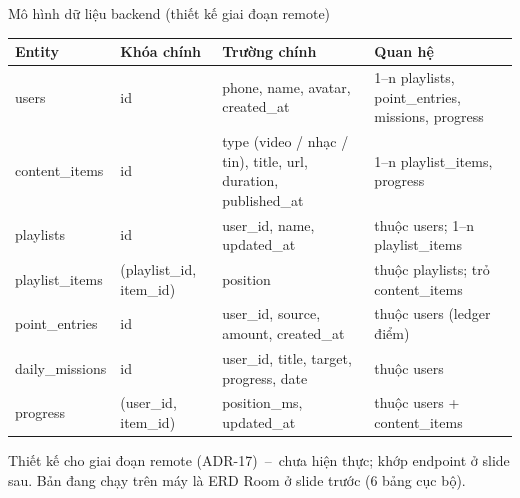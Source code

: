 \begin{frame}{Mô hình dữ liệu backend (thiết kế giai đoạn remote)}
\begin{center}\tiny
\setlength{\tabcolsep}{3pt}
\begin{tabular}{@{}p{2.4cm}p{2.6cm}p{4.4cm}p{3.5cm}@{}}
\toprule
\textbf{Entity} & \textbf{Khóa chính} & \textbf{Trường chính} & \textbf{Quan hệ} \\
\midrule
users & id & phone, name, avatar, created\_at & 1--n playlists, point\_entries, missions, progress \\
content\_items & id & type (video / nhạc / tin), title, url, duration, published\_at & 1--n playlist\_items, progress \\
playlists & id & user\_id, name, updated\_at & thuộc users; 1--n playlist\_items \\
playlist\_items & (playlist\_id, item\_id) & position & thuộc playlists; trỏ content\_items \\
point\_entries & id & user\_id, source, amount, created\_at & thuộc users (ledger điểm) \\
daily\_missions & id & user\_id, title, target, progress, date & thuộc users \\
progress & (user\_id, item\_id) & position\_ms, updated\_at & thuộc users + content\_items \\
\bottomrule
\end{tabular}
\end{center}
\vspace{1.2mm}
{\tiny\color{TextGray} Thiết kế cho giai đoạn remote (ADR-17)~--~chưa hiện thực; khớp endpoint ở slide sau. Bản đang chạy trên máy là ERD Room ở slide trước (6 bảng cục bộ).}
\end{frame}

